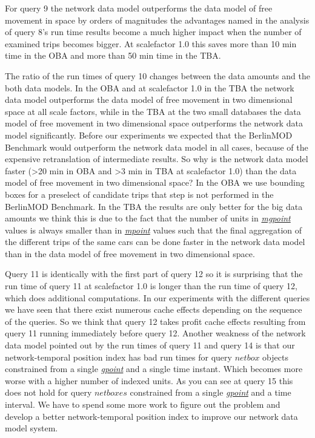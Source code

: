 \documentclass[a4paper]{article}
\newcommand{\bmodb} {BerlinMOD Benchmark}
\newcommand{\dt}[1]{\textsl{\underline{#1}}}
\begin{document}
{For query 9 the network data model outperforms the data model of free movement
in space by orders of magnitudes the advantages named in the analysis of query 8's
run time results become a much higher impact when the number of examined trips
becomes bigger. At scalefactor 1.0 this saves more than 10 min time in the OBA and
more than 50 min time in the TBA.

The ratio of the run times of query 10 changes between the data amounts and the
both data models. In the OBA and at scalefactor 1.0 in the TBA the network data
model outperforms the data model of free movement in two dimensional space at
all scale factors, while in the TBA at the two small databases the data model of
free movement in two dimensional space outperforms the network data model significantly.
Before our experiments we expected that the \bmodb{} would outperform the network
data model in all cases, because of the expensive retranslation of intermediate
results. So why is the network data model faster (>20 min in OBA and >3 min in TBA
at scalefactor 1.0) than the data model of free movement in two dimensional space?
In the OBA we use bounding boxes for a preselect of candidate trips that step is not
performed in the \bmodb{}. In the TBA the results are only better for the big data
amounts we think this is due to the fact that the number of units in \dt{mgpoint}
values is always smaller than in \dt{mpoint} values such that the final aggregation
of the different trips of the same cars can be done faster in the network data model
than in the data model of free movement in two dimensional space.

Query 11 is identically with the first part of query 12 so it is surprising that
the run time of query 11 at scalefactor 1.0 is longer than the run time of query 12,
which does additional computations. In our experiments with the different queries
we have seen that there exist numerous cache effects depending on the sequence of
the queries. So we think that query 12 takes profit cache effects resulting from
query 11 running immediately before query 12. Another weakness of the network
data model pointed out by the run times of query 11 and query 14 is that our
network-temporal position index has bad run times for query $netbox$ objects constrained
from a single \dt{gpoint} and a single time instant. Which becomes more worse
with a higher number of indexed units. As you can see at query 15 this does not
hold for query $netboxes$ constrained from a single \dt{gpoint} and a time interval.
We have to spend some more work to figure out the problem and develop a better
network-temporal position index to improve our network data model system.

}
\end{document}
